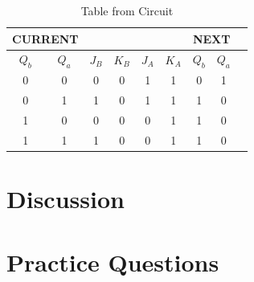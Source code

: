 \documentclass[12pt]{article}
\begin{document}
\begin{table}[H]
	\caption{Table from Circuit}\label{tab:}
	\begin{center}
		\begin{tabular}{|c|c|c|c|c|c|c|c|c}
			\hline
			\multicolumn{2}{|c|}{CURRENT} &         &         &         &         & \multicolumn{2}{c|}{NEXT}                     \\
			\hline
			\(Q_b\)                       & \(Q_a\) & \(J_B\) & \(K_B\) & \(J_A\) & \(K_A\)                   & \(Q_b\) & \(Q_a\) \\
			\hline
			0                             & 0       & 0       & 0       & 1       & 1                         & 0       & 1       \\
			0                             & 1       & 1       & 0       & 1       & 1                         & 1       & 0       \\
			1                             & 0       & 0       & 0       & 0       & 1                         & 1       & 0       \\
			1                             & 1       & 1       & 0       & 0       & 1                         & 1       & 0       \\
			\hline
		\end{tabular}
	\end{center}
\end{table}

\section*{Discussion}
\section*{Practice Questions}
\end{document}
